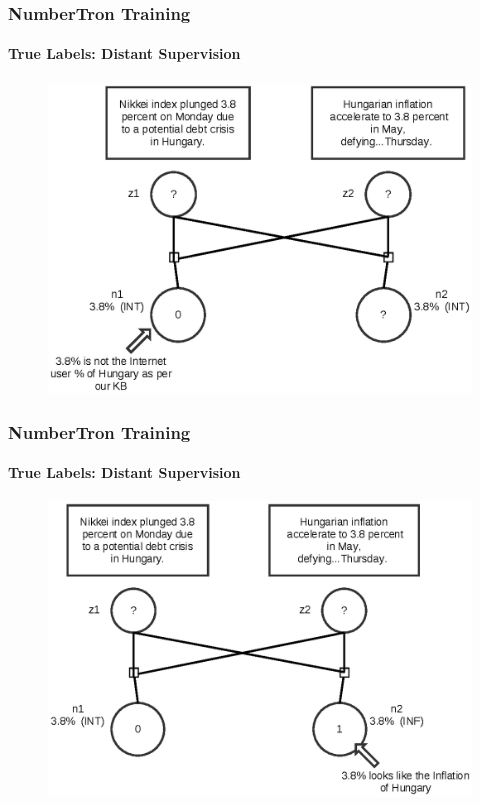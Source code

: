 \documentclass{beamer}
\begin{document}
\begin{frame}
\frametitle{NumberTron Training}
\framesubtitle{True Labels: Distant Supervision}
\begin{figure}
\includegraphics[width=\textwidth, height=0.8\textheight]{images/truelabel11.eps}
\end{figure}
\end{frame}


\begin{frame}
\frametitle{NumberTron Training}
\framesubtitle{True Labels: Distant Supervision}
\begin{figure}
\includegraphics[width=\textwidth, height=0.8\textheight]{images/truelabel12.eps}
\end{figure}
\end{frame}
\end{document}
